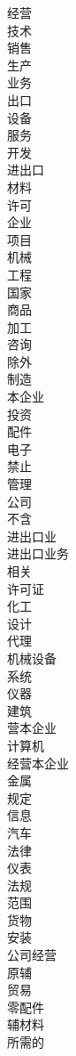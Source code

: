 \documentclass[12pt]{article}
\begin{document}
\begin{multicols}{5}
经营\\
技术\\
销售\\
生产\\
业务\\
出口\\
设备\\
服务\\
开发\\
进出口\\
材料\\
许可\\
企业\\
项目\\
机械\\
工程\\
国家\\
商品\\
加工\\
咨询\\
除外\\
制造\\
本企业\\
投资\\
配件\\
电子\\
禁止\\
管理\\
公司\\
不含\\
进出口业\\
进出口业务\\
相关\\
许可证\\
化工\\
设计\\
代理\\
机械设备\\
系统\\
仪器\\
建筑\\
营本企业\\
计算机\\
经营本企业\\
金属\\
规定\\
信息\\
汽车\\
法律\\
仪表\\
法规\\
范围\\
货物\\
安装\\
公司经营\\
原辅\\
贸易\\
零配件\\
辅材料\\
所需的
\end{multicols}
\end{document}
